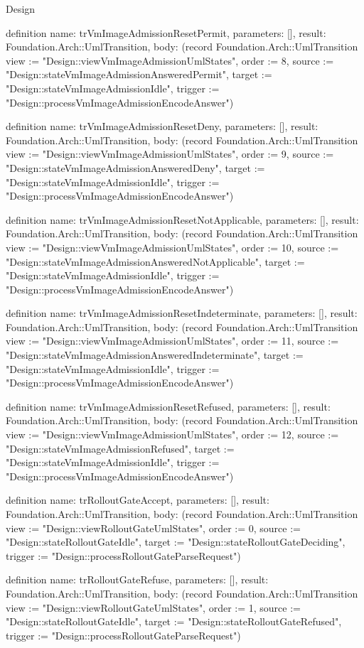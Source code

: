 \begin{lexlean}{Design}
\begin{semanticmodule}
definition{
  name: trVmImageAdmissionResetPermit,
  parameters: [],
  result: Foundation.Arch::UmlTransition,
  body: (record Foundation.Arch::UmlTransition {view := "Design::viewVmImageAdmissionUmlStates", order := 8, source := "Design::stateVmImageAdmissionAnsweredPermit", target := "Design::stateVmImageAdmissionIdle", trigger := "Design::processVmImageAdmissionEncodeAnswer"})
}

definition{
  name: trVmImageAdmissionResetDeny,
  parameters: [],
  result: Foundation.Arch::UmlTransition,
  body: (record Foundation.Arch::UmlTransition {view := "Design::viewVmImageAdmissionUmlStates", order := 9, source := "Design::stateVmImageAdmissionAnsweredDeny", target := "Design::stateVmImageAdmissionIdle", trigger := "Design::processVmImageAdmissionEncodeAnswer"})
}

definition{
  name: trVmImageAdmissionResetNotApplicable,
  parameters: [],
  result: Foundation.Arch::UmlTransition,
  body: (record Foundation.Arch::UmlTransition {view := "Design::viewVmImageAdmissionUmlStates", order := 10, source := "Design::stateVmImageAdmissionAnsweredNotApplicable", target := "Design::stateVmImageAdmissionIdle", trigger := "Design::processVmImageAdmissionEncodeAnswer"})
}

definition{
  name: trVmImageAdmissionResetIndeterminate,
  parameters: [],
  result: Foundation.Arch::UmlTransition,
  body: (record Foundation.Arch::UmlTransition {view := "Design::viewVmImageAdmissionUmlStates", order := 11, source := "Design::stateVmImageAdmissionAnsweredIndeterminate", target := "Design::stateVmImageAdmissionIdle", trigger := "Design::processVmImageAdmissionEncodeAnswer"})
}

definition{
  name: trVmImageAdmissionResetRefused,
  parameters: [],
  result: Foundation.Arch::UmlTransition,
  body: (record Foundation.Arch::UmlTransition {view := "Design::viewVmImageAdmissionUmlStates", order := 12, source := "Design::stateVmImageAdmissionRefused", target := "Design::stateVmImageAdmissionIdle", trigger := "Design::processVmImageAdmissionEncodeAnswer"})
}

definition{
  name: trRolloutGateAccept,
  parameters: [],
  result: Foundation.Arch::UmlTransition,
  body: (record Foundation.Arch::UmlTransition {view := "Design::viewRolloutGateUmlStates", order := 0, source := "Design::stateRolloutGateIdle", target := "Design::stateRolloutGateDeciding", trigger := "Design::processRolloutGateParseRequest"})
}

definition{
  name: trRolloutGateRefuse,
  parameters: [],
  result: Foundation.Arch::UmlTransition,
  body: (record Foundation.Arch::UmlTransition {view := "Design::viewRolloutGateUmlStates", order := 1, source := "Design::stateRolloutGateIdle", target := "Design::stateRolloutGateRefused", trigger := "Design::processRolloutGateParseRequest"})
}


\end{semanticmodule}
\end{lexlean}
